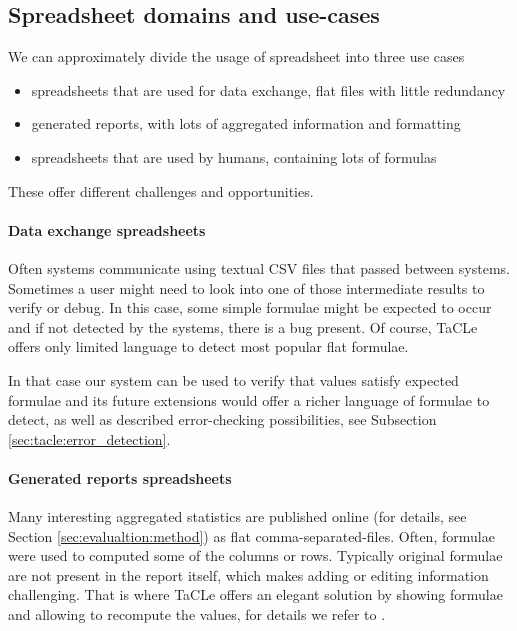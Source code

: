 \pubrev
\subsection{Spreadsheet domains and use-cases}
We can approximately divide the usage of spreadsheet into three use cases
\begin{itemize}
\item spreadsheets that are used for data exchange, flat files with little redundancy
\item generated reports, with lots of aggregated information and formatting
\item spreadsheets that are used by humans, containing lots of formulas
\end{itemize}
These offer different challenges and opportunities.

\paragraph{Data exchange spreadsheets}
Often systems communicate using textual CSV files that passed between systems. Sometimes a user might need to look into one of those intermediate results to verify or debug. In this case, some simple formulae might be expected to occur and if not detected by the systems, there is a bug present. Of course, TaCLe offers only limited language to detect most popular flat formulae.

In that case our system can be used to verify that values satisfy expected formulae and its future extensions would offer a richer language of formulae to detect, as well as described error-checking possibilities, see Subsection \ref{sec:tacle:error_detection}.

\paragraph{Generated reports spreadsheets}
Many interesting aggregated statistics are published online (for details, see Section \ref{sec:evalualtion:method}) as flat comma-separated-files. Often, formulae were used to computed some of the columns or rows. Typically original formulae are not present in the report itself, which makes adding or editing information challenging. That is where TaCLe offers an elegant solution by showing formulae and allowing to recompute the values, for details we refer to \textcite{tacle_demo}.

